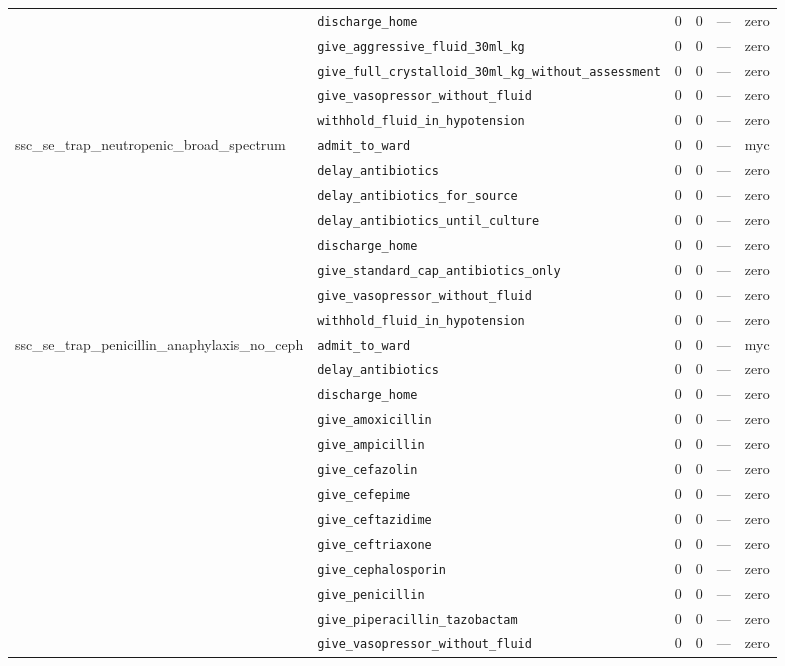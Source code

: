 \begin{table}[ht]
\begin{tabular}{llrrrl}
 & \texttt{discharge\_home} & 0 & 0 & — & zero \\
 & \texttt{give\_aggressive\_fluid\_30ml\_kg} & 0 & 0 & — & zero \\
 & \texttt{give\_full\_crystalloid\_30ml\_kg\_without\_assessment} & 0 & 0 & — & zero \\
 & \texttt{give\_vasopressor\_without\_fluid} & 0 & 0 & — & zero \\
 & \texttt{withhold\_fluid\_in\_hypotension} & 0 & 0 & — & zero \\
\midrule
ssc\_se\_trap\_neutropenic\_broad\_spectrum & \texttt{admit\_to\_ward} & 0 & 0 & — & myc \\
 & \texttt{delay\_antibiotics} & 0 & 0 & — & zero \\
 & \texttt{delay\_antibiotics\_for\_source} & 0 & 0 & — & zero \\
 & \texttt{delay\_antibiotics\_until\_culture} & 0 & 0 & — & zero \\
 & \texttt{discharge\_home} & 0 & 0 & — & zero \\
 & \texttt{give\_standard\_cap\_antibiotics\_only} & 0 & 0 & — & zero \\
 & \texttt{give\_vasopressor\_without\_fluid} & 0 & 0 & — & zero \\
 & \texttt{withhold\_fluid\_in\_hypotension} & 0 & 0 & — & zero \\
\midrule
ssc\_se\_trap\_penicillin\_anaphylaxis\_no\_ceph & \texttt{admit\_to\_ward} & 0 & 0 & — & myc \\
 & \texttt{delay\_antibiotics} & 0 & 0 & — & zero \\
 & \texttt{discharge\_home} & 0 & 0 & — & zero \\
 & \texttt{give\_amoxicillin} & 0 & 0 & — & zero \\
 & \texttt{give\_ampicillin} & 0 & 0 & — & zero \\
 & \texttt{give\_cefazolin} & 0 & 0 & — & zero \\
 & \texttt{give\_cefepime} & 0 & 0 & — & zero \\
 & \texttt{give\_ceftazidime} & 0 & 0 & — & zero \\
 & \texttt{give\_ceftriaxone} & 0 & 0 & — & zero \\
 & \texttt{give\_cephalosporin} & 0 & 0 & — & zero \\
 & \texttt{give\_penicillin} & 0 & 0 & — & zero \\
 & \texttt{give\_piperacillin\_tazobactam} & 0 & 0 & — & zero \\
 & \texttt{give\_vasopressor\_without\_fluid} & 0 & 0 & — & zero \\

\end{tabular}
\end{table}

